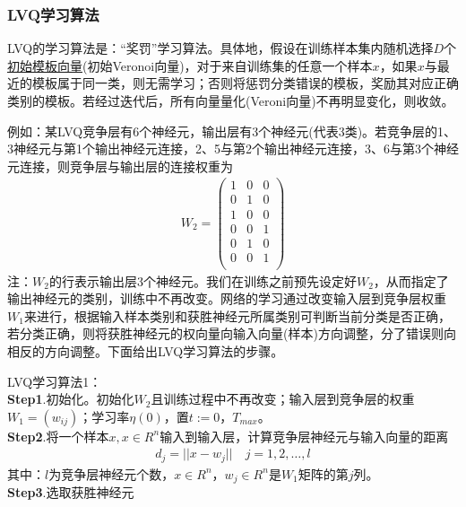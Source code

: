 {        \subsubsection{LVQ学习算法}
            \par
            LVQ的学习算法是：“奖罚”学习算法。具体地，假设在训练样本集内随机选择$D$个\uline{初始模板向量}(初始Veronoi向量)，对于来自训练集的任意一个样本$x$，如果$x$与最近的模板属于同一类，则无需学习；否则将惩罚分类错误的模板，奖励其对应正确类别的模板。若经过迭代后，所有向量量化(Veroni向量)不再明显变化，则收敛。
            \par
            例如：某LVQ竞争层有6个神经元，输出层有3个神经元(代表3类)。若竞争层的1、3神经元与第1个输出神经元连接，2、5与第2个输出神经元连接，3、6与第3个神经元连接，则竞争层与输出层的连接权重为
            \begin{align*}
            W_2 =
            \begin{pmatrix}
            1 & 0 & 0\\
            0 & 1 & 0\\
            1 & 0 & 0\\
            0 & 0 & 1\\
            0 & 1 & 0\\
            0 & 0 & 1\\
            \end{pmatrix}
            \end{align*}
            注：$W_2$的行表示输出层3个神经元。我们在训练之前预先设定好$W_2$，从而指定了输出神经元的类别，训练中不再改变。网络的学习通过改变输入层到竞争层权重$W_1$来进行，根据输入样本类别和获胜神经元所属类别可判断当前分类是否正确，若分类正确，则将获胜神经元的权向量向输入向量(样本)方向调整，分了错误则向相反的方向调整。下面给出LVQ学习算法的步骤。
            \par
            LVQ学习算法1：\\
            \textbf{Step1}.初始化。初始化$W_2$且训练过程中不再改变；输入层到竞争层的权重$W_1 = (w_{ij})$；学习率$\eta(0)$，置$t:=0$，$T_{max}$。\\
            \textbf{Step2}.将一个样本$x,x\in R^n$输入到输入层，计算竞争层神经元与输入向量的距离
            \begin{align*}
            d_j = ||x-w_j||\quad j = 1,2,\dots,l
            \end{align*}
            其中：$l$为竞争层神经元个数，$x\in R^n$，$w_j\in R^n$是$W_1$矩阵的第$j$列。\\
            \textbf{Step3}.选取获胜神经元
            \begin{align*}

\end{align*}}
